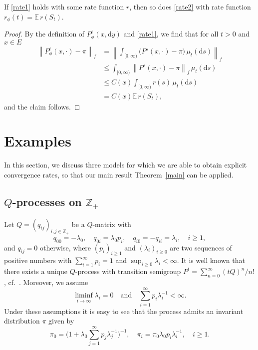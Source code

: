 \documentclass{aptpub}
\newcommand\EE{\mathds E}
\newcommand\Z{\mathds Z}
\newcommand\dup{\mathrm{d}}
\numberwithin{equation}{section}
\begin{document}
\begin{lem}\label{general}
    If \eqref{rate1} holds with some rate function $r$, then so does \eqref{rate2} with rate function $r_\phi(t)=\EE\,r(S_t)$.
\end{lem}

\begin{proof}
    By the definition of $P^t_\phi(x,\dup y)$ and \eqref{rate1}, we find that for all $t>0$ and $x\in E$
    \begin{align*}
        \left\|P^t_\phi(x,\cdot)-\pi\right\|_f
        &=\left\| \int_{[0,\infty)}\big(P^s(x,\cdot)-\pi\big)\, \mu_t(\dup s) \right\|_f\\
        &\leq\int_{[0,\infty)}\left\|P^s(x,\cdot)-\pi\right\|_f\, \mu_t(\dup s)\\
        &\leq C(x)\int_{[0,\infty)}r(s)\,\mu_t(\dup s)\\
        &=C(x)\EE\,r(S_t),
    \end{align*}
    and the claim follows.
\end{proof}





\section{Examples}\label{sec4}


In this section, we discuss three models for which we are able to obtain explicit convergence rates, so that our main result Theorem~\ref{main} can be applied.



\subsection{$Q$-processes on $\Z_+$}

Let $Q=(q_{i j})_{i, j\in\Z_+}$ be a $Q$-matrix with
$$
    q_{00}=-\lambda_0,
    \quad q_{0 i}=\lambda_0 p_i,
    \quad q_{i 0}=-q_{i i}=\lambda_i,
    \quad i\geq 1,
$$
and $q_{i j}=0$ otherwise, where $(p_i)_{i\geq1}$ and $(\lambda_i)_{i\geq0}$ are two sequences of positive numbers with $\sum_{i=1}^{\infty}p_i=1$ and $\sup_{i\geq0}\lambda_i<\infty$. It is well known that there exists a unique $Q$-process with transition semigroup $P^t=\sum_{n=0}^{\infty}(t Q)^n/n!$, cf.\ \cite[Corollary 2.24]{che04}. Moreover, we assume
$$
    \liminf_{i\to\infty}\lambda_i=0
    \quad\text{and}\quad
    \sum_{i=1}^{\infty}p_i\lambda_i^{-1}<\infty.
$$
Under these assumptions it is easy to see that the process admits an invariant distribution $\pi$ given by
$$
    \pi_0
    =\bigg(1+\lambda_0\sum_{j=1}^{\infty} p_j\lambda_j^{-1}\bigg)^{-1},
    \quad
    \pi_i
    = \pi_0\lambda_0 p_i\lambda_i^{-1},
    \quad i\geq1.
$$
\end{document}
